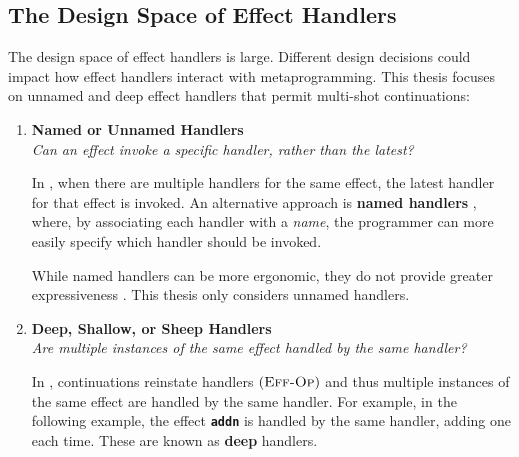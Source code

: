\subsection{The Design Space of Effect Handlers}\label{subsection:effect-handler-design}
The design space of effect handlers is large. Different design decisions could impact how effect handlers interact with metaprogramming. This thesis focuses on unnamed and deep effect handlers that permit multi-shot continuations:

\renewcommand{\effconfiguration}[2]{{#1}; {#2}}
\renewcommand{\transition}[2]{#1 & \rightarrow & #2}
\newcommand{\rulename}[2]{(\textsc{{#1}-{#2}})}
\newcommand{\reductionRule}[1]{\rulename{Red}{#1}}
\newcommand{\congruenceRule}[1]{\rulename{Cng}{#1}}
\newcommand{\effectRule}[1]{\rulename{Eff}{#1}}

\begin{enumerate} 

 \item \textbf{\textsf{Named or Unnamed Handlers}}\\
        \textit{Can an effect invoke a specific handler, rather than the latest?}
        
        In \efflang{}, when there are multiple handlers for the same effect, the latest handler for that effect is invoked. An alternative approach is \textbf{named handlers} \citep{xie-2022}, where, by associating each handler with a \textit{name}, the programmer can more easily specify which handler should be invoked. 

        While named handlers can be more ergonomic, they do not provide greater expressiveness \citep{xie-2022}. This thesis only considers unnamed handlers.

  \item \textbf{\textsf{Deep, Shallow, or Sheep Handlers}}\\
         \textit{Are multiple instances of the same effect handled by the same handler?}

         In \efflang{}, continuations reinstate handlers $\effectRule{Op}$ and thus multiple instances of the same effect are handled by the same handler. For example, in the following example, the effect \textbf{\texttt{addn}} is handled by the same handler, adding one each time. These are known as \textbf{deep} handlers.
          

\end{enumerate}

